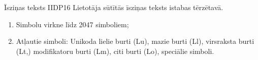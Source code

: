 {Īsziņas teksts}
{IIDP16}
{
	Lietotāja sūtītās īsziņas teksts istabas tērzētavā.
}
{
	\begin{enumerate}
		\item Simbolu virkne līdz 2047 simboliem;
		\item Atļautie simboli: Unikoda lielie burti (Lu), mazie burti (Ll), virsraksta burti (Lt,) modifikatoru burti (Lm), citi burti (Lo), speciālie simboli.
	\end{enumerate}
}
{
}
